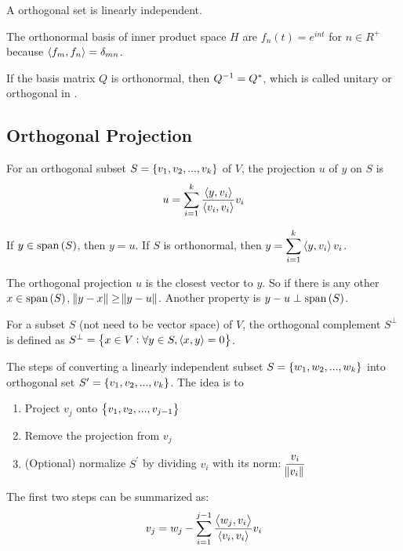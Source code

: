A orthogonal set is linearly independent.

The orthonormal basis of inner product space $H$ are $f_n(t) = e^{int}$ for $n \in R^+$ because $\left\langle \displaystyle f_m, f_n \right\rangle = \delta_{mn} $.

If the basis matrix $Q$ is orthonormal, then ${Q}^{-1} = Q^*$, which is called unitary or orthogonal in .



\subsection{Orthogonal Projection}

For an orthogonal subset $S=\set{v_1, v_2, ..., v_k}$ of $V$, the projection $u$ of $y$ on $S$ is 
\begin{equation}
    u = \sum_{i=1}^k \frac{\left\langle \displaystyle y, v_i \right\rangle}{\left\langle \displaystyle v_i, v_i \right\rangle} v_i
\end{equation}

If $y \in \displaystyle \text{span}\left( S \right)$, then $\displaystyle y = u$. If $S$ is orthonormal, then $\displaystyle y = \sum_{i=1}^k \left\langle \displaystyle y, v_i \right\rangle v_i$. 

The orthogonal projection $u$ is the closest vector to $y$. So if there is any other $x \in \displaystyle \text{span}\left( S \right)$, $\norm{y - x} \geq \norm{y - u}$. Another property is $y - u \perp \displaystyle \text{span}\left( S \right)$.


\begin{definition}
    For a subset $S$ (not need to be vector space) of $V$, the orthogonal complement $S^\perp$ is defined as $S^\perp=\set{x \in V: \forall y \in S, \left\langle \displaystyle x, y \right\rangle = 0}$.
\end{definition}



\begin{theorem}\label{gram_schmidt_process}
    The steps of converting a linearly independent subset $S=\set{w_1, w_2, ..., w_k}$ into orthogonal set $S^\prime=\set{v_1, v_2, ..., v_k}$. The idea is to 
    \begin{enumerate}
        \item Project $v_{j}$ onto $\set{v_1, v_2, ..., v_{j-1}}$
        \item Remove the projection from $v_j$
        \item (Optional) normalize $S^\prime$ by dividing $v_i$ with its norm: $\displaystyle \frac{v_i}{\norm{v_i}}$
    \end{enumerate}
    
    The first two steps can be summarized as:
    \begin{equation}
        v_j = w_j - \sum_{i=1}^{j-1} \frac{\left\langle \displaystyle w_j, v_i \right\rangle}{\left\langle \displaystyle v_i, v_i \right\rangle} v_i
    \end{equation}
\end{theorem}

